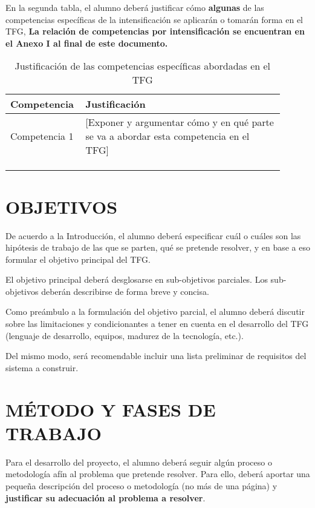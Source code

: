 \documentclass{pre-tfg}
\begin{document}
\clearpage

En la segunda tabla, el alumno deberá justificar cómo \textbf{algunas}
de las competencias específicas de la intensificación se aplicarán o
tomarán forma en el TFG, \textbf{La relación de competencias por
  intensificación se encuentran en el Anexo I al final de este
  documento. }


\begin{table}[hp]
  \centering
  \caption{Justificación de las competencias específicas abordadas en el TFG}
  \label{tab:competencias}

  \begin{tabular}{p{0.2\linewidth}p{0.7\linewidth}}
    \textbf{Competencia} & \textbf{Justificación} \\
    \hline
    Competencia 1 & [Exponer y argumentar cómo y en qué parte se va a
    abordar esta competencia en el TFG]\\
    & \\
    & \\
    & \\
    \hline
  \end{tabular}
\end{table}


\section{OBJETIVOS}

De acuerdo a la Introducción, el alumno deberá especificar cuál o cuáles son las hipótesis
de trabajo de las que se parten, qué se pretende resolver, y en base a eso formular el
objetivo principal del TFG.

El objetivo principal deberá desglosarse en sub-objetivos parciales. Los sub-objetivos
deberán describirse de forma breve y concisa.

Como preámbulo a la formulación del objetivo parcial, el alumno deberá discutir sobre las
limitaciones y condicionantes a tener en cuenta en el desarrollo del TFG (lenguaje de
desarrollo, equipos, madurez de la tecnología, etc.).

Del mismo modo, será recomendable incluir una lista preliminar de requisitos del sistema a
construir.


\section{MÉTODO Y FASES DE TRABAJO}

Para el desarrollo del proyecto, el alumno deberá seguir algún proceso o metodología afín
al problema que pretende resolver. Para ello, deberá aportar una pequeña descripción del
proceso o metodología (no más de una página) y \textbf{justificar su adecuación al
  problema a resolver}.
\end{document}
